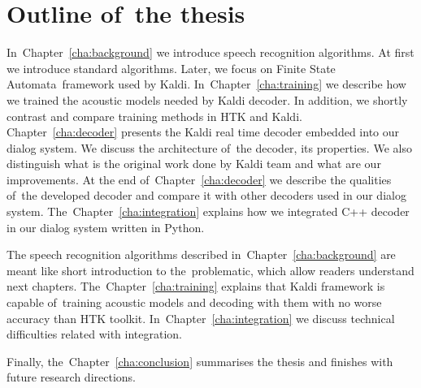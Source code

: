 

\section{Outline of~the thesis} 
\label{sec:outline_of_the_thesis}
In~Chapter~\ref{cha:background} we introduce speech recognition algorithms. At first we introduce standard algorithms. Later, we focus on Finite State Automata~framework used by Kaldi. In~Chapter~\ref{cha:training} we describe how we trained the acoustic models needed by Kaldi decoder. In addition, we shortly contrast and compare training methods in HTK and Kaldi. Chapter~\ref{cha:decoder} presents the Kaldi real time decoder embedded into our dialog system. We discuss the architecture of~the decoder, its properties. We also distinguish what is the original work done by Kaldi team and what are our improvements. At the end of~Chapter~\ref{cha:decoder} we describe the qualities of~the developed decoder and compare it with other decoders used in our dialog system.
The~Chapter~\ref{cha:integration} explains how we integrated C++ decoder in our dialog system written in Python.
    
The speech recognition algorithms described in~Chapter~\ref{cha:background} are meant like short introduction to the~problematic, which allow readers understand next chapters. The~Chapter~\ref{cha:training} explains that Kaldi framework is capable of~training acoustic models and decoding with them with no worse accuracy than HTK toolkit. In~Chapter~\ref{cha:integration} we discuss technical difficulties related with integration. 

Finally, the~Chapter~\ref{cha:conclusion} summarises the thesis and finishes with future research directions.

